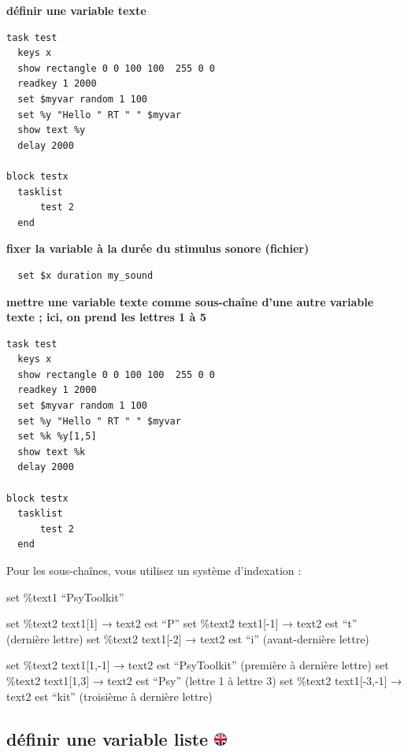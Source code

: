 \documentclass[
]{book}
\begin{document}
\textbf{définir une variable texte}

\begin{verbatim}
task test
  keys x
  show rectangle 0 0 100 100  255 0 0
  readkey 1 2000
  set $myvar random 1 100
  set %y "Hello " RT " " $myvar
  show text %y
  delay 2000

block testx
  tasklist
      test 2
  end
\end{verbatim}

\textbf{fixer la variable à la durée du stimulus sonore (fichier)}

\begin{verbatim}
  set $x duration my_sound
\end{verbatim}

\textbf{mettre une variable texte comme sous-chaîne d'une autre variable texte ; ici, on prend les lettres 1 à 5}

\begin{verbatim}
task test
  keys x
  show rectangle 0 0 100 100  255 0 0
  readkey 1 2000
  set $myvar random 1 100
  set %y "Hello " RT " " $myvar
  set %k %y[1,5]
  show text %k
  delay 2000

block testx
  tasklist
      test 2
  end
\end{verbatim}

Pour les sous-chaînes, vous utilisez un système d'indexation :

set \%text1 ``PsyToolkit''

set \%text2 text1{[}1{]} → text2 est ``P'' set \%text2 text1{[}-1{]} → text2 est ``t'' (dernière lettre) set \%text2 text1{[}-2{]} → text2 est ``i'' (avant-dernière lettre)

set \%text2 text1{[}1,-1{]} → text2 est ``PsyToolkit'' (première à dernière lettre) set \%text2 text1{[}1,3{]} → text2 est ``Psy'' (lettre 1 à lettre 3) set \%text2 text1{[}-3,-1{]} → text2 est ``kit'' (troisième à dernière lettre)

\hypertarget{duxe9finir-une-variable-liste}{%
\subsection[définir une variable liste ]{\texorpdfstring{définir une variable liste \href{https://www.psytoolkit.org/doc3.4.0/syntax.html\#set_array}{\protect\includegraphics{img/ukflag.png}}}{définir une variable liste }}\label{duxe9finir-une-variable-liste}}
\end{document}
